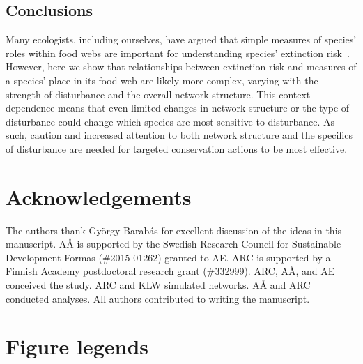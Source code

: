\documentclass[12pt]{article}
\begin{document}
\begin{spacing}{1.0}
    
    \subsection*{Conclusions}
    
    Many ecologists, including ourselves, have argued that simple measures of species' roles within food webs are important for understanding species' extinction risk~\citep{Santos2021,dunne2009cascading, Eklof2006,binzer2011susceptibility}. 
    However, here we show that relationships between extinction risk and measures of a species' place in its food web are likely more complex, varying with the strength of disturbance and the overall network structure.
    This context-dependence means that even limited changes in network structure or the type of disturbance could change which species are most sensitive to disturbance. 
    As such, caution and increased attention to both network structure and the specifics of disturbance are needed for targeted conservation actions to be most effective. 
    
\section*{Acknowledgements}

    The authors thank Gy\"{o}rgy Barab\'{a}s for excellent discussion of the ideas in this manuscript. A{\AA} is supported by the Swedish Research Council for Sustainable Development Formas (\#2015-01262) granted to AE. ARC is supported by a Finnish Academy postdoctoral research grant (\#332999). ARC, A\r{A}, and AE conceived the study. ARC and KLW simulated networks. A\r{A} and ARC conducted analyses. All authors contributed to writing the manuscript.


 
 

\clearpage

\section*{Figure legends}
    


\end{spacing}
\end{document}
